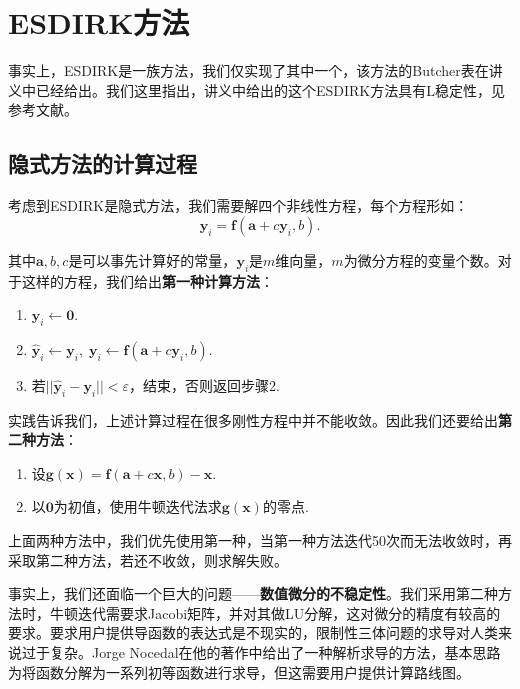\documentclass[lang=cn,10pt,bibend=bibtex]{elegantbook}
\begin{document}
\section{ESDIRK方法}

事实上，ESDIRK是一族方法，我们仅实现了其中一个，该方法的Butcher表在讲义中已经给出。我们这里指出，讲义中给出的这个ESDIRK方法具有L稳定性，见参考文献\cite{2003Additive}。

\subsection{隐式方法的计算过程}

考虑到ESDIRK是隐式方法，我们需要解四个非线性方程，每个方程形如：
\begin{equation}
  \mathbf{y}_i=\mathbf{f}(\mathbf{a}+c\mathbf{y}_i,b).
\end{equation}

其中$\mathbf{a},b,c$是可以事先计算好的常量，$\mathbf{y}_i$是$m$维向量，$m$为微分方程的变量个数。对于这样的方程，我们给出\textbf{第一种计算方法}：

\begin{enumerate}[itemindent=1em]
  \item $\mathbf{y}_i\gets \mathbf{0}$.
  \item $\hat{\mathbf{y}}_i\gets \mathbf{y}_i,\;\mathbf{y}_i\gets\mathbf{f}(\mathbf{a}+c\mathbf{y}_i,b)$.
  \item 若$||\hat{\mathbf{y}}_i-\mathbf{y}_i||<\varepsilon$，结束，否则返回步骤2.
\end{enumerate}

实践告诉我们，上述计算过程在很多刚性方程中并不能收敛。因此我们还要给出\textbf{第二种方法}：

\begin{enumerate}[itemindent=1em]
  \item 设$\mathbf{g}(\mathbf{x})=\mathbf{f}(\mathbf{a}+c\mathbf{x},b)-\mathbf{x}$.
  \item 以$\mathbf{0}$为初值，使用牛顿迭代法求$\mathbf{g}(\mathbf{x})$的零点.
\end{enumerate}

上面两种方法中，我们优先使用第一种，当第一种方法迭代50次而无法收敛时，再采取第二种方法，若还不收敛，则求解失败。

事实上，我们还面临一个巨大的问题——\textbf{数值微分的不稳定性}。我们采用第二种方法时，牛顿迭代需要求Jacobi矩阵，并对其做LU分解，这对微分的精度有较高的要求。要求用户提供导函数的表达式是不现实的，限制性三体问题的求导对人类来说过于复杂。Jorge Nocedal在他的著作\cite{1999NumOpt}中给出了一种解析求导的方法，基本思路为将函数分解为一系列初等函数进行求导，但这需要用户提供计算路线图。
\end{document}
